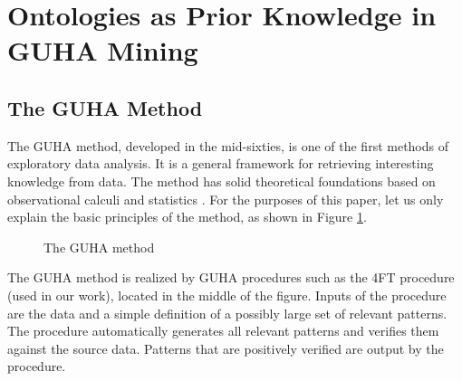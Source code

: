 \section{Ontologies as Prior Knowledge in GUHA Mining} \label{OntologiesAssociation}

\subsection{The GUHA Method}
\label{section:guha}
The GUHA method, developed in the mid-sixties, is one of the first methods of exploratory data analysis. 
It is a general framework for retrieving interesting knowledge from data. 
The method has solid theoretical foundations based on observational calculi and statistics \cite{GUHA}. 
For the purposes of this paper, let us only explain the basic principles of the method, as shown in Figure \ref{fig:GUHA}.

\begin{figure}[ht]
\centering
\mbox{}
\caption{The GUHA method}
\label{fig:GUHA}
\end{figure}

The GUHA method is realized by GUHA procedures such as the 4FT procedure (used in our work), located in the middle of the figure. 
Inputs of the procedure are the data and a simple definition of a possibly large set of relevant patterns. 
The procedure automatically generates all relevant patterns and verifies them against the source data. 
Patterns that are positively verified are output by the procedure.

